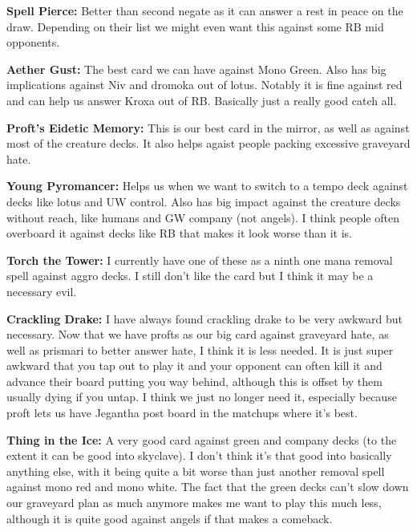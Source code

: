 \documentclass[12pt]{article}
\begin{document}
\vspace{0.4em}
\noindent \textbf{Spell Pierce:}
Better than second negate as it can answer a rest in peace on the draw. Depending on their list we might even want this against some RB mid opponents.

\vspace{0.4em}
\noindent \textbf{Aether Gust:}
The best card we can have against Mono Green. Also has big implications against Niv and dromoka out of lotus. Notably it is fine against red and can help us answer Kroxa out of RB. Basically just a really good catch all.

\vspace{0.4em}
\noindent \textbf{Proft's Eidetic Memory:}
This is our best card in the mirror, as well as against most of the creature decks. It also helps agaist people packing excessive graveyard hate.

\vspace{0.4em}
\noindent \textbf{Young Pyromancer:}
Helps us when we want to switch to a tempo deck against decks like lotus and UW control. Also has big impact against the creature decks without reach, like humans and GW company (not angels). I think people often overboard it against decks like RB that makes it look worse than it is.

\vspace{0.4em}
\noindent \textbf{Torch the Tower:}
I currently have one of these as a ninth one mana removal spell against aggro decks. I still don't like the card but I think it may be a necessary evil.

\vspace{0.4em}
\noindent \textbf{Crackling Drake:}
I have always found crackling drake to be very awkward but necessary. Now that we have profts as our big card against graveyard hate, as well as prismari to better answer hate, I think it is less needed. It is just super awkward that you tap out to play it and your opponent can often kill it and advance their board putting you way behind, although this is offset by them usually dying if you untap. I think we just no longer need it, especially because proft lets us have Jegantha post board in the matchups where it's best.

\vspace{0.4em}
\noindent \textbf{Thing in the Ice:}
A very good card against green and company decks (to the extent it can be good into skyclave). I don't think it's that good into basically anything else, with it being quite a bit worse than just another removal spell against mono red and mono white. The fact that the green decks can't slow down our graveyard plan as much anymore makes me want to play this much less, although it is quite good against angels if that makes a comeback.
\end{document}
